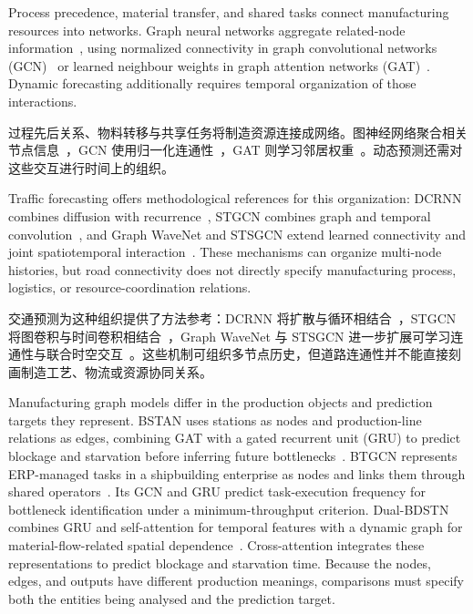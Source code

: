 \documentclass[a4paper,fleqn]{cas-dc}
\newcommand{\zhpara}[1]{%
  \par\begingroup\small\color{black!72}\noindent #1\par\endgroup}
\begin{document}
Process precedence, material transfer, and shared tasks connect manufacturing resources into networks. Graph neural networks aggregate related-node information~\cite{wu2021gnn}, using normalized connectivity in graph convolutional networks (GCN)~\cite{kipf2017gcn} or learned neighbour weights in graph attention networks (GAT)~\cite{velickovic2018gat}. Dynamic forecasting additionally requires temporal organization of those interactions.

\zhpara{过程先后关系、物料转移与共享任务将制造资源连接成网络。图神经网络聚合相关节点信息~\cite{wu2021gnn}，GCN 使用归一化连通性~\cite{kipf2017gcn}，GAT 则学习邻居权重~\cite{velickovic2018gat}。动态预测还需对这些交互进行时间上的组织。}


Traffic forecasting offers methodological references for this organization: DCRNN combines diffusion with recurrence~\cite{li2018dcrnn}, STGCN combines graph and temporal convolution~\cite{yu2018stgcn}, and Graph WaveNet and STSGCN extend learned connectivity and joint spatiotemporal interaction~\cite{wu2019graphwavenet,song2020stsgcn}. These mechanisms can organize multi-node histories, but road connectivity does not directly specify manufacturing process, logistics, or resource-coordination relations.

\zhpara{交通预测为这种组织提供了方法参考：DCRNN 将扩散与循环相结合~\cite{li2018dcrnn}，STGCN 将图卷积与时间卷积相结合~\cite{yu2018stgcn}，Graph WaveNet 与 STSGCN 进一步扩展可学习连通性与联合时空交互~\cite{wu2019graphwavenet,song2020stsgcn}。这些机制可组织多节点历史，但道路连通性并不能直接刻画制造工艺、物流或资源协同关系。}


Manufacturing graph models differ in the production objects and prediction targets they represent. BSTAN uses stations as nodes and production-line relations as edges, combining GAT with a gated recurrent unit (GRU) to predict blockage and starvation before inferring future bottlenecks~\cite{lai2023bstan}. BTGCN represents ERP-managed tasks in a shipbuilding enterprise as nodes and links them through shared operators~\cite{yin2025btgcn}. Its GCN and GRU predict task-execution frequency for bottleneck identification under a minimum-throughput criterion. Dual-BDSTN combines GRU and self-attention for temporal features with a dynamic graph for material-flow-related spatial dependence~\cite{cen2025dstnn}. Cross-attention integrates these representations to predict blockage and starvation time. Because the nodes, edges, and outputs have different production meanings, comparisons must specify both the entities being analysed and the prediction target.
\end{document}

